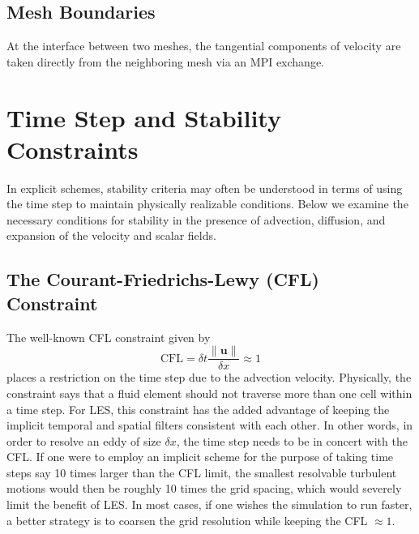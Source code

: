 \subsection{Mesh Boundaries}

At the interface between two meshes, the tangential components of velocity are taken directly from the neighboring mesh via an MPI exchange. 




\newpage
\section{Time Step and Stability Constraints}
\label{stability}

In explicit schemes, stability criteria may often be understood in terms of using the time step to maintain physically realizable conditions.  Below we examine the necessary conditions for stability in the presence of advection, diffusion, and expansion of the velocity and scalar fields.

\subsection{The Courant-Friedrichs-Lewy (CFL) Constraint}

The well-known CFL constraint given by
\begin{equation}
\mbox{CFL} = \delta t \frac{\|\mathbf{u}\|}{\delta x} \approx 1
\end{equation}
places a restriction on the time step due to the advection velocity. Physically, the constraint says that a fluid element should not traverse more than one cell within a time step. For LES, this constraint has the added advantage of keeping the implicit temporal and spatial filters consistent with each other.  In other words, in order to resolve an eddy of size $\delta x$, the time step needs to be in concert with the CFL.  If one were to employ an implicit scheme for the purpose of taking time steps say 10 times larger than the CFL limit, the smallest resolvable turbulent motions would then be roughly 10 times the grid spacing, which would severely limit the benefit of LES.  In most cases, if one wishes the simulation to run faster, a better strategy is to coarsen the grid resolution while keeping the CFL $\approx 1$.

